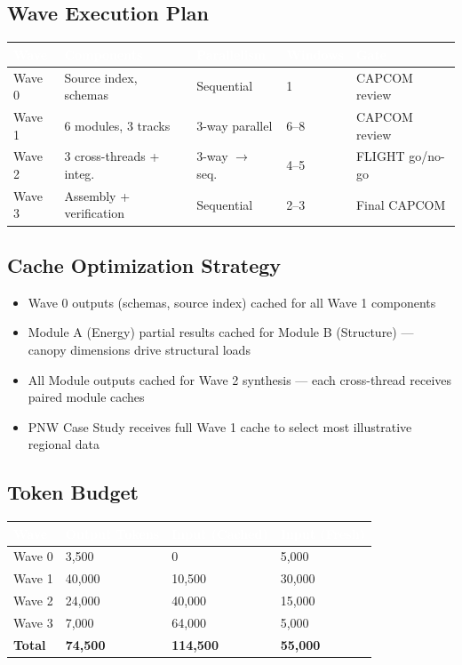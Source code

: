\documentclass[11pt,letterpaper]{article}
\newcommand{\tableheader}[1]{\textbf{\sffamily\textcolor{white}{#1}}}
\begin{document}
\subsection{Wave Execution Plan}

\begin{center}
\begin{tabularx}{\textwidth}{L{2cm}L{3cm}C{2cm}C{2cm}X}
\toprule
{}
\tableheader{Wave} & \tableheader{Components} & \tableheader{Parallelism} & \tableheader{Windows} & \tableheader{Gate} \\
\midrule
Wave 0 & Source index, schemas & Sequential & 1 & CAPCOM review \\
Wave 1 & 6 modules, 3 tracks & 3-way parallel & 6--8 & CAPCOM review \\
Wave 2 & 3 cross-threads + integ. & 3-way $\rightarrow$ seq. & 4--5 & FLIGHT go/no-go \\
Wave 3 & Assembly + verification & Sequential & 2--3 & Final CAPCOM \\
\bottomrule
\end{tabularx}
\end{center}

\subsection{Cache Optimization Strategy}
\begin{itemize}
  \item Wave 0 outputs (schemas, source index) cached for all Wave 1 components
  \item Module A (Energy) partial results cached for Module B (Structure) --- canopy dimensions drive structural loads
  \item All Module outputs cached for Wave 2 synthesis --- each cross-thread receives paired module caches
  \item PNW Case Study receives full Wave 1 cache to select most illustrative regional data
\end{itemize}

\subsection{Token Budget}

\begin{center}
\begin{tabularx}{\textwidth}{L{4cm}C{2cm}C{2cm}C{2cm}}
\toprule
{}
\tableheader{Wave} & \tableheader{Output Tokens} & \tableheader{Input (Cached)} & \tableheader{Input (Fresh)} \\
\midrule
Wave 0 & 3,500 & 0 & 5,000 \\
Wave 1 & 40,000 & 10,500 & 30,000 \\
Wave 2 & 24,000 & 40,000 & 15,000 \\
Wave 3 & 7,000 & 64,000 & 5,000 \\
\midrule
\textbf{Total} & \textbf{74,500} & \textbf{114,500} & \textbf{55,000} \\
\bottomrule
\end{tabularx}
\end{center}
\end{document}
